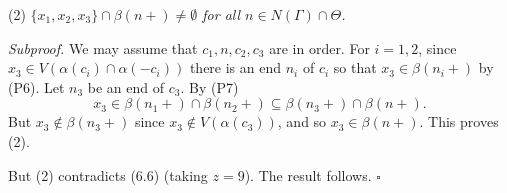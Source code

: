 \hspace*{12pt}(2) \textit{$\{x_1, x_2, x_3\} \cap \beta(n+) \ne \emptyset$ for all $n \in N(\Gamma) \cap \Theta$.}

\textit{Subproof.} We may assume that $c_1, n, c_2, c_3$ are in order. For $i = 1, 2$, since $x_3 \in V(\alpha(c_i) \cap \alpha(-c_i))$ there is an end $n_i$ of $c_i$ so that $x_3 \in \beta(n_i+)$ by (P6). Let $n_3$ be an end of $c_3$. By (P7)
\begin{equation*}
x_3 \in \beta(n_1+) \cap \beta(n_2+) \subseteq \beta(n_3+) \cap \beta(n+).
\end{equation*}
But $x_3 \notin \beta(n_3+)$ since $x_3 \notin V(\alpha(c_3))$, and so $x_3 \in \beta(n+)$. This proves (2).

But (2) contradicts (6.6) (taking $z = 9$). The result follows. $\square$
